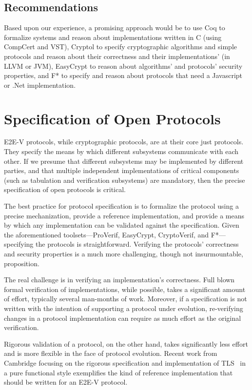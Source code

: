 \subsection{Recommendations}

Based upon our experience, a promising approach would be to use Coq to
formalize systems and reason about implementations written in C (using
CompCert and VST), Cryptol to specify cryptographic algorithms and
simple protocols and reason about their correctness and their
implementations' (in LLVM or JVM), EasyCrypt to reason about
algorithms' and protocols' security properties, and F* to specify and
reason about protocols that need a Javascript or .Net implementation.

\section{Specification of Open Protocols} 

E2E-V protocols, while cryptographic protocols, are at their core just
protocols. They specify the means by which different subsystems
communicate with each other. If we presume that different subsystems
may be implemented by different parties, and that multiple independent
implementations of critical components (such as tabulation and
verification subsystems) are mandatory, then the precise specification
of open protocols is critical.

The best practice for protocol specification is to formalize the
protocol using a precise mechanization, provide a reference
implementation, and provide a means by which any implementation can be
validated against the specification. Given the aforementioned
toolsets---ProVerif, EasyCrypt, CryptoVerif, and F*---specifying the
protocols is straightforward. Verifying the protocols' correctness and
security properties is a much more challenging, though not
insurmountable, proposition.

The real challenge is in verifying an implementation's correctness.
Full blown formal verification of implementations, while possible,
takes a significant amount of effort, typically several man-months of
work. Moreover, if a specification is not written with the intention
of supporting a protocol under evolution, re-verifying changes in a
protocol implementation can require as much effort as the original
verification.

Rigorous validation of a protocol, on the other hand, takes
significantly less effort and is more flexible in the face of protocol
evolution. Recent work from Cambridge focusing on the rigorous
specification and implementation of TLS~\cite{nqsb-TLS} in a pure
functional style exemplifies the kind of reference implementation that
should be written for an E2E-V protocol.

